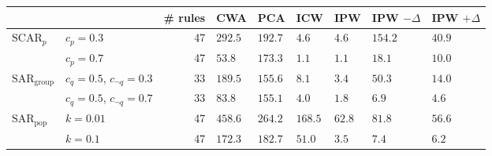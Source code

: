 \begin{tabular}{ll|r|ll|l|lll}
\toprule
                          &         &  \# rules &      CWA &      PCA &         ICW &         IPW & IPW $-\Delta$ & IPW $+\Delta$ \\
\midrule
$\text{SCAR}_{p}$ & $c_p=0.3$ &        47 &  $292.5$ &  $192.7$ &  $\bm{4.6}$ &  $\bm{4.6}$ &       $154.2$ &        $40.9$ \\
                          & $c_p=0.7$ &        47 &   $53.8$ &  $173.3$ &  $\bm{1.1}$ &  $\bm{1.1}$ &        $18.1$ &        $10.0$ \\
$\text{SAR}_{\text{group}}$ & $c_{q}=0.5$, $c_{\neg q}=0.3$ &        33 &  $189.5$ &  $155.6$ &       $8.1$ &  $\bm{3.4}$ &        $50.3$ &        $14.0$ \\
                          & $c_{q}=0.5$, $c_{\neg q}=0.7$ &        33 &   $83.8$ &  $155.1$ &       $4.0$ &  $\bm{1.8}$ &         $6.9$ &         $4.6$ \\
$\text{SAR}_{\text{pop}}$ & $k=0.01$ &        47 &  $458.6$ &  $264.2$ &     $168.5$ &      $62.8$ &        $81.8$ &   $\bm{56.6}$ \\
                          & $k=0.1$ &        47 &  $172.3$ &  $182.7$ &      $51.0$ &  $\bm{3.5}$ &         $7.4$ &         $6.2$ \\
\bottomrule
\end{tabular}
